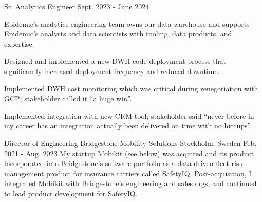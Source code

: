 \begin{cventries}
  \vspace{-1.0mm}
  \cventry
    {Sr. Analytics Engineer} %
    {} %
    {} %
    {Sept. 2023 - June 2024} %
    {
    Epidemic's analytics engineering team owns our data warehouse and supports Epidemic's analysts
    and data scientists with tooling, data products, and expertise.
    \vspace{5.0mm}
      \begin{cvitems} %
        \item {Designed and implemented a new DWH code deployment process that significantly increased deployment frequency and reduced downtime.}
        \item {Implemented DWH cost monitoring which was critical during renegotiation with GCP; stakeholder called it “a huge win”.}
        \item {Implemented integration with new CRM tool; stakeholder said “never before in my career has an integration actually been delivered on time with no hiccups”.}
      \end{cvitems}
    }



  \cventry
    {Director of Engineering} %
    {Bridgestone Mobility Solutions} %
    {Stockholm, Sweden} %
    {Feb. 2021 - Aug. 2023} %
    {
    My startup Mobikit (see below) was acquired and its product incorporated into Bridgestone's software portfolio as a data-driven fleet risk management product for insurance carriers called SafetyIQ. Post-acquisition, I integrated Mobikit with Bridgestone's engineering and sales orgs, and continued to lead product development for SafetyIQ.
    }


\end{cventries}
